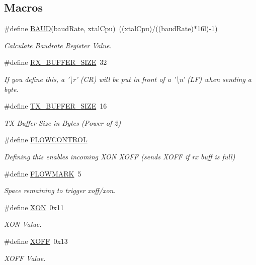\subsection*{Macros}
\begin{DoxyCompactItemize}
\item 
\#define \hyperlink{group__uart_gafccfd7d1315f0763ac404c6104883341}{B\-A\-U\-D}(baud\-Rate, xtal\-Cpu)~((xtal\-Cpu)/((baud\-Rate)$\ast$16l)-\/1)
\begin{DoxyCompactList}\small\item\em Calculate Baudrate Register Value. \end{DoxyCompactList}\item 
\#define \hyperlink{group__uart_ga739a2a1a0047c98ac1b18ecd25dac092}{R\-X\-\_\-\-B\-U\-F\-F\-E\-R\-\_\-\-S\-I\-Z\-E}~32
\begin{DoxyCompactList}\small\item\em If you define this, a '\textbackslash{}r' (C\-R) will be put in front of a '\textbackslash{}n' (L\-F) when sending a byte. \end{DoxyCompactList}\item 
\#define \hyperlink{group__uart_ga9ab33647617098646990fe263600b650}{T\-X\-\_\-\-B\-U\-F\-F\-E\-R\-\_\-\-S\-I\-Z\-E}~16
\begin{DoxyCompactList}\small\item\em T\-X Buffer Size in Bytes (Power of 2) \end{DoxyCompactList}\item 
\#define \hyperlink{group__uart_gaff1f07741fbe1f53f46098687f0a05e2}{F\-L\-O\-W\-C\-O\-N\-T\-R\-O\-L}
\begin{DoxyCompactList}\small\item\em Defining this enables incoming X\-O\-N X\-O\-F\-F (sends X\-O\-F\-F if rx buff is full) \end{DoxyCompactList}\item 
\#define \hyperlink{group__uart_gaa7907a070ef8e6d68d7d774b34eebe66}{F\-L\-O\-W\-M\-A\-R\-K}~5
\begin{DoxyCompactList}\small\item\em Space remaining to trigger xoff/xon. \end{DoxyCompactList}\item 
\#define \hyperlink{group__uart_gacdf721774c51e08c6609e6fa8cf82cc9}{X\-O\-N}~0x11
\begin{DoxyCompactList}\small\item\em X\-O\-N Value. \end{DoxyCompactList}\item 
\#define \hyperlink{group__uart_ga67fd78ae15d2b67c10d44d69a49ab1c5}{X\-O\-F\-F}~0x13
\begin{DoxyCompactList}\small\item\em X\-O\-F\-F Value. \end{DoxyCompactList}\end{DoxyCompactItemize}
